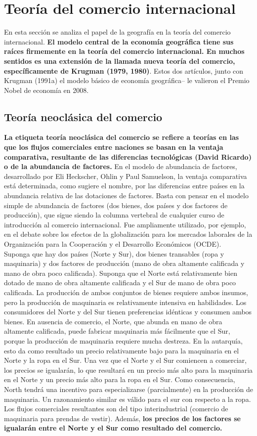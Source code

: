 \section{Teoría del comercio internacional}
En esta sección se analiza el papel de la geografía en la teoría del comercio internacional. \textbf{El modelo central de la economía geográfica tiene sus raíces firmemente en la teoría del comercio internacional. En muchos sentidos es una extensión de la llamada nueva teoría del comercio, específicamente de Krugman (1979, 1980)}. Estos dos artículos, junto con Krugman (1991a) el modelo básico de economía geográfica– le valieron el Premio Nobel de economía en 2008.

\subsection{Teoría neoclásica del comercio}
\textbf{La etiqueta teoría neoclásica del comercio se refiere a teorías en las que los flujos comerciales entre naciones se basan en la ventaja comparativa, resultante de las diferencias tecnológicas (David Ricardo) o de la abundancia de factores.} En el modelo de abundancia de factores, desarrollado por Eli Heckscher, Ohlin y Paul Samuelson, la ventaja comparativa está determinada, como sugiere el nombre, por las diferencias entre países en la abundancia relativa de las dotaciones de factores. Basta con pensar en el modelo simple de abundancia de factores (dos bienes, dos países y dos factores de producción), que sigue siendo la columna vertebral de cualquier curso de introducción al comercio internacional. Fue ampliamente utilizado, por ejemplo, en el debate sobre los efectos de la globalización para los mercados laborales de la Organización para la Cooperación y el Desarrollo Económicos (OCDE).\\
Suponga que hay dos países (Norte y Sur), dos bienes transables (ropa y maquinaria) y dos factores de producción (mano de obra altamente calificada y mano de obra poco calificada). Suponga que el Norte está relativamente bien dotado de mano de obra altamente calificada y el Sur de mano de obra poco calificada. La producción de ambos conjuntos de bienes requiere ambos insumos, pero la producción de maquinaria es relativamente intensiva en habilidades. Los consumidores del Norte y del Sur tienen preferencias idénticas y consumen ambos bienes. En ausencia de comercio, el Norte, que abunda en mano de obra altamente calificada, puede fabricar maquinaria más fácilmente que el Sur, porque la producción de maquinaria requiere mucha destreza. En la autarquía, esto da como resultado un precio relativamente bajo para la maquinaria en el Norte y la ropa en el Sur. Una vez que el Norte y el Sur comiencen a comerciar, los precios se igualarán, lo que resultará en un precio más alto para la maquinaria en el Norte y un precio más alto para la ropa en el Sur. Como consecuencia, North tendrá una incentivo para especializarse (parcialmente) en la producción de maquinaria. Un razonamiento similar es válido para el sur con respecto a la ropa. Los flujos comerciales resultantes son del tipo interindustrial (comercio de maquinaria para prendas de vestir). Además, \textbf{los precios de los factores se igualarán entre el Norte y el Sur como resultado del comercio.}\\
